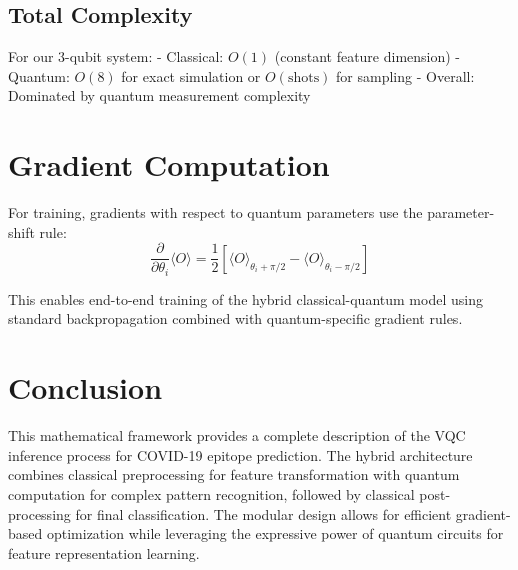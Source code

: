 \documentclass[12pt]{article}
\begin{document}
\subsection{Total Complexity}
For our 3-qubit system:
- Classical: $O(1)$ (constant feature dimension)
- Quantum: $O(8)$ for exact simulation or $O(\text{shots})$ for sampling
- Overall: Dominated by quantum measurement complexity

\section{Gradient Computation}

For training, gradients with respect to quantum parameters use the parameter-shift rule:
\begin{equation}
\frac{\partial}{\partial \theta_i} \langle O \rangle = \frac{1}{2} \left[ \langle O \rangle_{\theta_i + \pi/2} - \langle O \rangle_{\theta_i - \pi/2} \right]
\end{equation}

This enables end-to-end training of the hybrid classical-quantum model using standard backpropagation combined with quantum-specific gradient rules.

\section{Conclusion}

This mathematical framework provides a complete description of the VQC inference process for COVID-19 epitope prediction. The hybrid architecture combines classical preprocessing for feature transformation with quantum computation for complex pattern recognition, followed by classical post-processing for final classification. The modular design allows for efficient gradient-based optimization while leveraging the expressive power of quantum circuits for feature representation learning.
\end{document}
